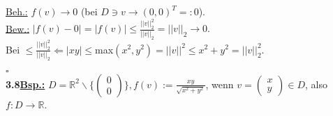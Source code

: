 \documentclass[]{scrartcl}
\begin{document}
	\underline{Beh.:} $f(v)\rightarrow0$ (bei $D \ni v \rightarrow(0,0)^T=:0$).\\
	\underline{Bew.:} $|f(v)-0| = |f(v)| \leq \frac{||v||^2_2}{||v||_2}= ||v||_2\rightarrow0.$\\
	Bei  $\leq \frac{||v||^2_2}{||v||_2} \Leftarrow |xy|\leq $max$(x^2,y^2)=||v||^2\leq x^2+y^2=||v||^2_2$.\\
	\strut\hfill$\square$\\
	\textbf{3.8\underline{Bsp.:}} $D = \mathbb{R}^2 \backslash\{\begin{pmatrix}0\\0\end{pmatrix}\}, f(v):=\frac{xy}{\sqrt{x^2+y^2}}$, wenn $v=\begin{pmatrix}x\\y\end{pmatrix} \in D$, also $f:D\rightarrow\mathbb{R}$.\\
		
\end{document}
